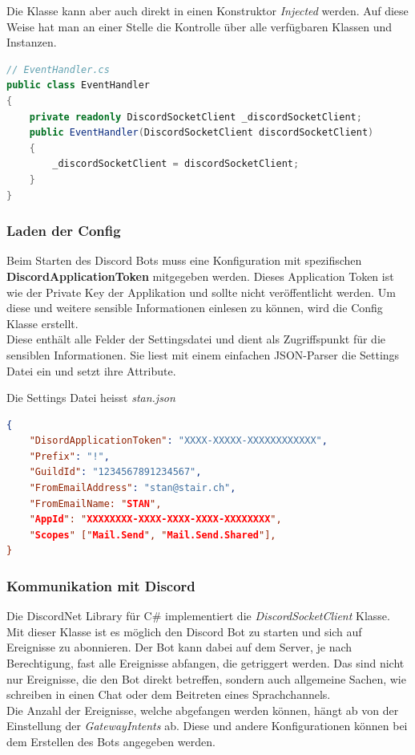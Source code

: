 \documentclass[a4paper, table]{article}
\begin{document}
Die Klasse kann aber auch direkt in einen Konstruktor \textit{Injected} werden.
Auf diese Weise hat man an einer Stelle die Kontrolle über alle verfügbaren Klassen und Instanzen.
\begin{lstlisting}[language=csharp]
// EventHandler.cs
public class EventHandler
{
    private readonly DiscordSocketClient _discordSocketClient;
    public EventHandler(DiscordSocketClient discordSocketClient)
    {
        _discordSocketClient = discordSocketClient;
    }
}
\end{lstlisting}

\subsubsection*{Laden der Config}
Beim Starten des Discord Bots muss eine Konfiguration mit spezifischen \textbf{DiscordApplicationToken} mitgegeben werden.
Dieses Application Token ist wie der Private Key der Applikation und sollte nicht veröffentlicht werden.
Um diese und weitere sensible Informationen einlesen zu können, wird die Config Klasse erstellt.\\
Diese enthält alle Felder der Settingsdatei und dient als Zugriffspunkt für die sensiblen Informationen.
Sie liest mit einem einfachen JSON-Parser die Settings Datei ein und setzt ihre Attribute.

Die Settings Datei heisst \textit{stan.json}
\begin{lstlisting}[language=json]
{
    "DisordApplicationToken": "XXXX-XXXXX-XXXXXXXXXXXX",
    "Prefix": "!",
    "GuildId": "1234567891234567",
    "FromEmailAddress": "stan@stair.ch",
    "FromEmailName: "STAN",
    "AppId": "XXXXXXXX-XXXX-XXXX-XXXX-XXXXXXXX",
    "Scopes" ["Mail.Send", "Mail.Send.Shared"],
}
\end{lstlisting}

\subsubsection{Kommunikation mit Discord}
Die DiscordNet Library für C\# implementiert die \textit{DiscordSocketClient} Klasse.
Mit dieser Klasse ist es möglich den Discord Bot zu starten und sich auf Ereignisse zu abonnieren.
Der Bot kann dabei auf dem Server, je nach Berechtigung, fast alle Ereignisse abfangen, die getriggert werden.
Das sind nicht nur Ereignisse, die den Bot direkt betreffen, sondern auch allgemeine Sachen, 
wie schreiben in einen Chat oder dem Beitreten eines Sprachchannels.\\
Die Anzahl der Ereignisse, welche abgefangen werden können, hängt ab von der Einstellung der \textit{GatewayIntents} ab.
Diese und andere Konfigurationen können bei dem Erstellen des Bots angegeben werden.
\end{document}
